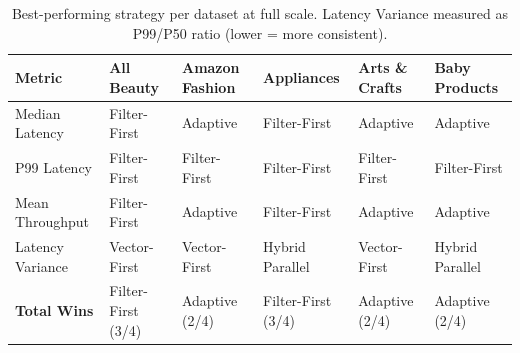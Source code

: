 \begin{table}[ht]
\centering
\small
\begin{tabular}{llllll}
\hline
Metric & All Beauty & Amazon Fashion & Appliances & Arts \& Crafts & Baby Products \\
\hline
Median Latency & Filter-First & Adaptive & Filter-First & Adaptive & Adaptive \\
P99 Latency & Filter-First & Filter-First & Filter-First & Filter-First & Filter-First \\
Mean Throughput & Filter-First & Adaptive & Filter-First & Adaptive & Adaptive \\
Latency Variance & Vector-First & Vector-First & Hybrid Parallel & Vector-First & Hybrid Parallel \\
\hline
\textbf{Total Wins} & Filter-First (3/4) & Adaptive (2/4) & Filter-First (3/4) & Adaptive (2/4) & Adaptive (2/4) \\
\hline
\end{tabular}
\caption{Best-performing strategy per dataset at full scale. Latency Variance measured as P99/P50 ratio (lower = more consistent).}
\label{tab:winners}
\end{table}